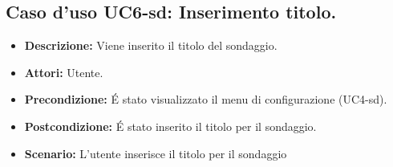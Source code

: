 \subsection{Caso d'uso UC6-sd: Inserimento titolo.}
\begin{itemize}
\item[]\textbf{Descrizione:} Viene inserito il titolo del sondaggio.
\item[]\textbf{Attori:} Utente. 
\item[]\textbf{Precondizione:} \'E stato visualizzato il menu di configurazione (UC4-sd). 
\item[]\textbf{Postcondizione:} \'E stato inserito il titolo per il sondaggio. 
\item[]\textbf{Scenario:}
L'utente inserisce il titolo per il sondaggio 
\end{itemize}

\clearpage

